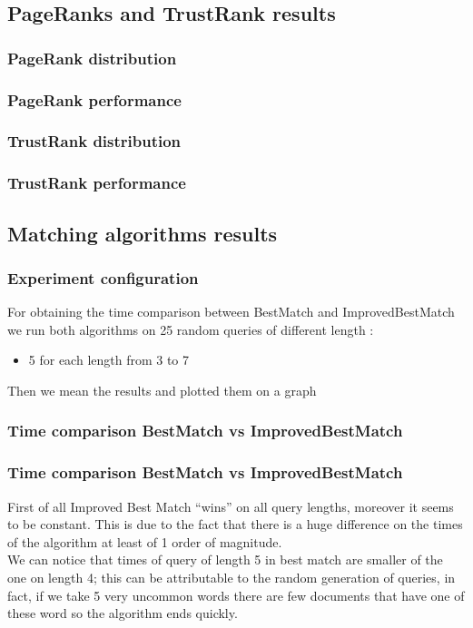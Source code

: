 \documentclass{beamer}
\begin{document}
\subsection{PageRanks and TrustRank results}

\begin{frame}
\frametitle{PageRank distribution}
\end{frame}

\begin{frame}
\frametitle{PageRank performance}
\end{frame}

\begin{frame}
\frametitle{TrustRank distribution}
\end{frame}

\begin{frame}
\frametitle{TrustRank performance}
\end{frame}

\subsection{Matching algorithms results}
\begin{frame}
\frametitle{Experiment configuration}
For obtaining the time comparison between BestMatch and ImprovedBestMatch we run both algorithms on 25 random queries of different length :\\
\begin{itemize}
\item 5 for each length from 3 to 7
\end{itemize} 
Then we mean the results and plotted them on a graph
\end{frame}

\begin{frame}
	\frametitle{Time comparison BestMatch vs ImprovedBestMatch}
	\begin{center}
	\end{center}
\end{frame}

\begin{frame}
\frametitle{Time comparison BestMatch vs ImprovedBestMatch}
First of all  Improved Best Match ``\alert{wins}'' on all query lengths, moreover it seems to be constant. This is due to the fact that there is a huge difference on the times of the algorithm at least of 1 order of magnitude.\\
\medskip
We can notice that times of query of length 5 in best match are smaller of the one on length 4; this can be attributable to the random generation of queries, in fact, if we take 5 very uncommon words there are \alert{few} documents that have one of these word so the algorithm ends quickly. 
\end{frame}
\end{document}
